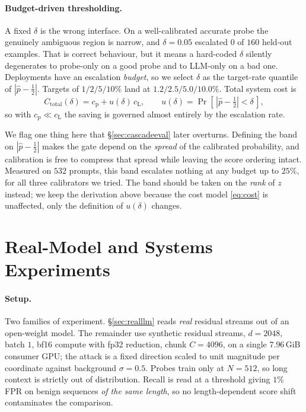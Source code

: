 \documentclass[10pt]{article}
\theoremstyle{plain}
\theoremstyle{definition}
\theoremstyle{remark}
\begin{document}
\paragraph{Budget-driven thresholding.}
A fixed $\delta$ is the wrong interface. On a well-calibrated accurate probe the genuinely
ambiguous region is narrow, and $\delta{=}0.05$ escalated $0$ of $160$ held-out examples.
That is correct behaviour, but it means a hard-coded $\delta$ silently degenerates to
probe-only on a good probe and to LLM-only on a bad one. Deployments have an escalation
\emph{budget}, so we select $\delta$ as the target-rate quantile of $|\hat p-\tfrac12|$.
Targets of $1/2/5/10\%$ land at $1.2/2.5/5.0/10.0\%$. Total system cost is
\begin{equation}
  C_{\mathrm{total}}(\delta)=c_{\mathrm{p}}+u(\delta)\,c_{\mathrm{L}},
  \qquad u(\delta)=\Pr[\,|\hat p-\tfrac12|<\delta\,],
  \label{eq:cost}
\end{equation}
so with $c_{\mathrm p}\!\ll\!c_{\mathrm L}$ the saving is governed almost entirely by the
escalation rate.

We flag one thing here that \S\ref{sec:cascadeeval} later overturns. Defining the band on
$|\hat p-\tfrac12|$ makes the gate depend on the \emph{spread} of the calibrated
probability, and calibration is free to compress that spread while leaving the score
ordering intact. Measured on $532$ prompts, this band escalates nothing at any budget up
to $25\%$, for all three calibrators we tried. The band should be taken on the
\emph{rank} of $z$ instead; we keep the derivation above because the cost model
\eqref{eq:cost} is unaffected, only the definition of $u(\delta)$ changes.

\section{Real-Model and Systems Experiments}
\label{sec:empirical}
\paragraph{Setup.} Two families of experiment. \S\ref{sec:realllm} reads \emph{real}
residual streams out of an open-weight model. The remainder use synthetic residual
streams, $d{=}2048$, batch $1$, bf16 compute with fp32 reduction, chunk $C{=}4096$, on a
single 7.96\,GiB consumer GPU; the attack is a fixed direction scaled to unit magnitude
per coordinate against background $\sigma{=}0.5$. Probes train only at $N{=}512$, so long
context is strictly out of distribution. Recall is read at a threshold giving $1\%$ FPR on
benign sequences \emph{of the same length}, so no length-dependent score shift
contaminates the comparison.
\end{document}
